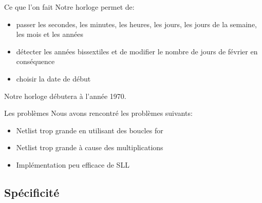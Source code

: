 \documentclass{beamer}
\begin{document}
\begin{frame}{Ce que l'on fait}
    Notre horloge permet de:
    \begin{itemize}
        \item passer les secondes, les minutes, les heures, les jours, les jours de la semaine, les mois et les années
        \item détecter les années bissextiles et de modifier le nombre de jours de février en conséquence
        \item choisir la date de début
    \end{itemize}

    Notre horloge débutera à l'année 1970.
\end{frame}

\begin{frame}{Les problèmes}
    Nous avons rencontré les problèmes suivants:
    \begin{itemize}
        \item Netlist trop grande en utilisant des boucles for
        \item Netlist trop grande à cause des multiplications
        \item Implémentation peu efficace de SLL 
    \end{itemize}
\end{frame}

\subsection{Spécificité}
\end{document}
